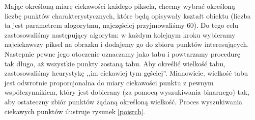 \documentclass[a4paper,12pt,leqno]{article}
\begin{document}
Mając określoną miarę ciekawości każdego piksela, chcemy wybrać określoną liczbę punktów charakterystycznych, które będą opisywały kształt obiektu
(liczba ta jest parametrem alogorytmu, najczęściej przyjmowaliśmy 60). Do tego celu zastosowaliśmy następujący algorytm: w każdym kolejnym kroku wybieramy
najciekawszy piksel na obrazku i dodajemy go do zbioru punktów interesujących. Nastepnie pewne jego otoczenie oznaczamy jako tabu i powtarzamy procedurę tak
długo, aż wszystkie punkty zostaną tabu. Aby określić wielkość tabu, zastosowaliśmy heurystykę ,,im ciekawiej tym gęściej''. Mianowicie, wielkość tabu jest
odwrotnie proporcjonalna do miary ciekawości punktu z pewnym współczynnikiem, który jest dobierany (za pomocą wyszukiwania binarnego) tak, aby ostateczny
zbiór punktów żądaną określoną wielkość. Proces wyszukiwania ciekawych punktów ilustruje rysunek \ref{poisrch}.
\end{document}

